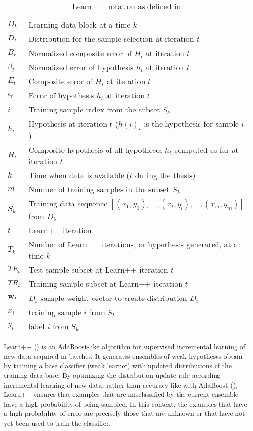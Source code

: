 \renewcommand{\thetable}{\hspace{-3pt}-A I-\arabic{table}}
\begin{table}[ht]
  \centering
  \captionsetup{list=no}
  \caption{Learn++ notation as defined in \cite{polikar01}}
  \label{tab:learn++notation}
\begin{tabular}{|ll|}
\hline
$D_k$ & Learning data block at a time $k$ \\
$D_t$ & Distribution for the sample selection at iteration $t$ \\
$B_t$ & Normalized composite error of $H_t$ at iteration $t$ \\
$\beta_t$ & Normalized error of hypothesis $h_t$ at iteration $t$ \\
$E_t$ & Composite error of $H_t$ at iteration $t$ \\
$\epsilon_t$ & Error of hypothesis $h_t$ at iteration $t$ \\
$i$ & Training sample index from the subset $S_k$ \\
$h_t$ & Hypothesis at iteration $t$ ($h(i)_t$ is the hypothesis for sample 
			  $i$)\\
$H_t$ & Composite hypothesis of all hypotheses $h_t$ computed so far at iteration $t$ \\
$k$ & Time when data is available ($t$ during the thesis) \\
$m$ & Number of training samples in the subset $S_k$ \\
$S_k$ & Training data sequence $[(x_1,y_1),...,(x_i,y_i),...,(x_m,y_m)]$ from $D_k$ \\
$t$ & Learn++ iteration \\
$T_k$ & Number of Learn++ iterations, or hypothesis generated, at a time $k$ \\
$TE_t$ & Test sample subset at Learn++ iteration $t$ \\
$TR_t$ & Training sample subset at Learn++ iteration $t$ \\
$\textbf{w}_t$ & $D_k$ sample weight vector to create distribution $D_t$ \\ 
$x_i$ & training sample $i$ from $S_k$ \\
$y_i$ & label $i$ from $S_k$ \\
\hline
\end{tabular}
\end{table}

Learn++ (\cite{polikar01}) is an AdaBoost-like algorithm for supervised incremental learning of new data acquired in batches. 
It generates ensembles of weak hypotheses obtain by training a base classifier (weak learner) with updated distributions of the training data base.
By optimizing the distribution update rule according incremental learning of new data, rather than accuracy like with AdaBoost (\cite{freund97}), Learn++ ensures that examples that are misclassified by the current ensemble have a high probability of being sampled.
In this context, the examples that have a high probability of error are precisely those that are unknown or that have not yet been used to train the classifier.

